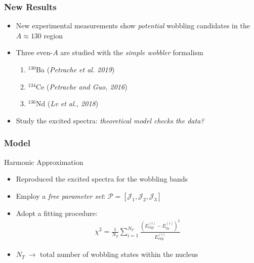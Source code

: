 \documentclass{beamer}
\begin{document}
\begin{frame}
  \frametitle{New Results}
  \begin{itemize}
    \item New experimental measurements show \emph{potential} wobbling candidates in the $A\approx 130$ region
    \item Three even-$A$ are studied with the \emph{simple wobbler} formalism
    \begin{enumerate}
      \item $^{130}$Ba (\emph{Petrache et al. 2019})
      \item $^{134}$Ce (\emph{Petrache and Guo, 2016})
      \item $^{136}$Nd (\emph{Lv et al., 2018})
    \end{enumerate}
    \item Study the excited spectra: \emph{theoretical model checks the data?}
  \end{itemize}
\end{frame}

\begin{frame}
  \frametitle{Model}

  \begin{alertblock}{Harmonic Approximation}
    \begin{itemize}
      \item Reproduced the excited spectra for the wobbling bands
      \item Employ a \emph{free parameter set}: $\mathcal{P}=\left[\mathcal{J}_1,\mathcal{J}_2,\mathcal{J}_3\right]$
      \item Adopt a fitting procedure:
      \begin{align}
        \chi^2=\frac{1}{N_T}\sum_{i=1}^{N_T}\frac{\left(E_\text{exp}^{(i)}-E_\text{th}^{(i)}\right)^2}{E_\text{exp}^{(i)}}
      \end{align}
      \item $N_T\ \rightarrow$ total number of wobbling states within the nucleus
    \end{itemize}
  \end{alertblock}

\end{frame}
\end{document}

